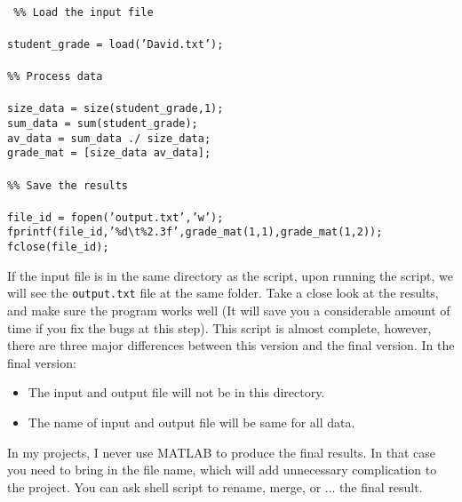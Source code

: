 \begin{mdframed}[hidealllines=true,backgroundcolor=gray!20]
\begin{singlespace}
\fontsize{10pt}{1pt}
\texttt{
\\
\noindent
{ \color{matlab_green} \%\% Load the input file} \\
\\
 student\_grade = load({\color{matlab_pink}'David.txt'}); \\
 \\
 {\color{matlab_green}\%\% Process data}\\
 \\
size\_data = size(student\_grade,1);\\
sum\_data = sum(student\_grade); \\
av\_data = sum\_data ./ size\_data; \\
grade\_mat = [size\_data av\_data]; \\
\\
{\color{matlab_green}\%\% Save the results}\\
\\
 file\_id = fopen({\color{matlab_pink}'output.txt'},{\color{matlab_pink}'w'});\\
 fprintf(file\_id,{\color{matlab_pink}'\%d\textbackslash t\%2.3f'},grade\_mat(1,1),grade\_mat(1,2));\\
 fclose(file\_id);\\
 }
\end{singlespace}
\end{mdframed}

\noindent
If the input file is in the same directory as the script, upon running the script, we will see the \texttt{output.txt} file at the same folder. Take a close look at the results, and make sure the program works well (It will save you a considerable amount of time if you fix the bugs at this step). This script is almost complete, however, there are three major differences between this version and the final version. In the final version:

\begin{itemize}
\item{The input and output file will not be in this directory.}
\item{The name of input and output file will be same for all data.}
\end{itemize}
\noindent
In my projects, I never use MATLAB to produce the final results. In that case you need to bring in the file name, which will add unnecessary complication to the project. You can ask shell script to rename, merge, or ... the final result. \\


